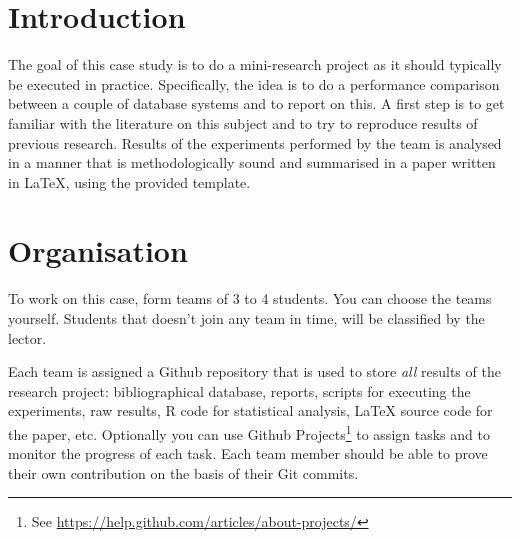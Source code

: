 \documentclass[fleqn,10pt]{artikeltin}
\affiliation{\textbf{Contact:}
    \textsuperscript{1} \href{mailto:wim.goedertier@hogent.be}{wim.goedertier@hogent.be};
    \textsuperscript{2} \href{mailto:jens.buysse@hogent.be}{jens.buysse@hogent.be};
    \textsuperscript{3} \href{mailto:bert.vanvreckem@hogent.be}{bert.vanvreckem@hogent.be};
    \textsuperscript{4} \href{mailto:wim.debruyn@hogent.be}{wim.debruyn@hogent.be}}
\begin{document}
\maketitle %
\tableofcontents %
\thispagestyle{empty} %


\section{Introduction} %
\label{sec:introduction}

The goal of this case study is to do a mini-research project as it should typically be executed in practice. Specifically, the idea is to do a performance comparison between a couple of database systems and to report on this. A first step is to get familiar with the literature on this subject and to try to reproduce results of previous research. Results of the experiments performed by the team is analysed in a manner that is methodologically sound and summarised in a paper written in {\LaTeX}, using the provided template.

\section{Organisation}
\label{sec:organisation}

To work on this case, form teams of 3 to 4 students. You can choose the teams yourself. Students that doesn't join any team in time, will be classified by the lector.

Each team is assigned a Github repository that is used to store \emph{all} results of the research project: bibliographical database, reports, scripts for executing the experiments, raw results, R code for statistical analysis, {\LaTeX} source code for the paper, etc. Optionally you can use Github Projects\footnote{See \url{https://help.github.com/articles/about-projects/}} to assign tasks and to monitor the progress of each task. Each team member should be able to prove their own contribution on the basis of their Git commits.
\end{document}
